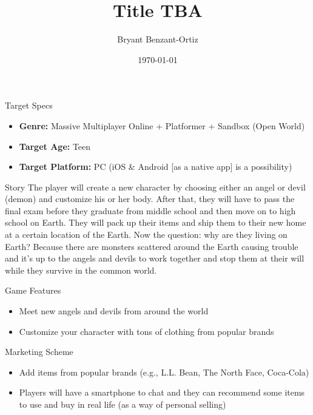 \documentclass[12pt]{beamer}
\title{Title TBA}
\author{Bryant Benzant-Ortiz}
\date{\today}
\begin{document}
\begin{frame}
  \titlepage
\end{frame}

\begin{frame}{Target Specs}
	\begin{itemize}
		\item \textbf{Genre:} Massive Multiplayer Online + Platformer + Sandbox (Open World)
		\item \textbf{Target Age:} Teen
		\item \textbf{Target Platform:} PC (iOS \& Android [as a native app] is a possibility)
	\end{itemize}
\end{frame}

\begin{frame}{Story}
	The player will create a new character by choosing either an angel or devil (demon) and customize his or her body. After that, they will have to pass the final exam before they graduate from middle school and then move on to high school on Earth. They will pack up their items and ship them to their new home at a certain location of the Earth. Now the question: why are they living on Earth? Because there are monsters scattered around the Earth causing trouble and it's up to the angels and devils to work together and stop them at their will while they survive in the common world.
\end{frame}

\begin{frame}{Game Features}
	\begin{itemize}
		\item Meet new angels and devils from around the world
		\item Customize your character with tons of clothing from popular brands
	\end{itemize}
\end{frame}

\begin{frame}{Marketing Scheme}
	\begin{itemize}
		\item Add items from popular brands (e.g., L.L. Bean, The North Face, Coca-Cola)
		\item Players will have a smartphone to chat and they can recommend some items to use and buy in real life (as a way of personal selling)
	\end{itemize}
\end{frame}
\end{document}
